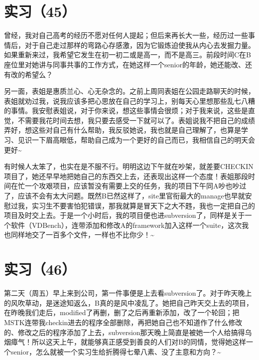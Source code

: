 \documentclass[12pt]{book}
\begin{document}
\section{实习（45）}
\label{sec-5-48}

曾经，我对自己高考的经历不愿对任何人提起；但后来再长大一些，经历过一些事情后，对于自己走过那样的弯路心存感激，因为它锻炼迫使我从内心去发掘力量。如果重新来过，我希望它发生在初一初二或是高一，而不是高三。前段时间C在B座位里对她讲与同事共事的工作方式，在她这样一个senior的年龄，她还能改、还有改的希望么？

另一面，表姐是惠质兰心、心无杂念的。之前上周同表姐在公园走路聊天的时候，表姐就劝过我，说我应该多把心思放在自己的学习上，别每天心里想那些乱七八糟的事情。我安慰表姐说，对于你来说，想这些事情会很烦；对于我来说，这些是直觉，不需要我花时间去想，我只要去感受一下就可以了。表姐说我不把自己的成绩弄好，想这些对自己有什么帮助，我反驳她说，我也就是自己理解了，也算是学习、见识一下眉高眼低，帮助自己成为一个更好的自己而已，我相信自己的明天会更好\textasciitilde{}~

有时候人太笨了，也实在是不服不行。明明这边下午就在吵架，就差要CHECKIN项目了，她还早早地把她自己的东西交上去，还表现出这样一个态度！表姐那段时间在忙一个攻艰项目，应该暂没有需要上交的任务，我的项目下午同A吵也吵过了，应该不会有太大问题。既然B已然这样了，site里官衔最大的manage也早就安慰过我，实习生不要害怕犯错误，那我就算是冒天下之大不韪，我也一定把自己的项目及时交上去。于是一个小时后，我的项目便也进subversion了，同样是关于一个软件（VDBench），连带添加和修改A的framework加入这样一个suite，这次我也同样地交了一百多个文件，一样也不比你少！\textasciitilde{}~


\section{实习（46）}
\label{sec-5-49}

第二天（周五）早上来到公司，第一件事便是上去看subversion了。对于昨天晚上的风吹草动，是迷途知返么，B真的是风中凌乱了。她把自己昨天交上去的项目，在昨晚我们走后，modified了再删，删了之后再重新添加，改了一个轮回；把MSTK连带我checkin进去的程序全部删除，再把她自己也不知道作了什么修改的、修改之后的程序添加了上去，subversion那天晚上简直是被她一个人给搞得乌烟瘴气！所以这天上午，就能够真正感受到善良的人们对B的同情，觉得她这样一个senior，怎么就被一个实习生给折腾得七晕八素、没了主意和方向？\textasciitilde{}~
\end{document}
